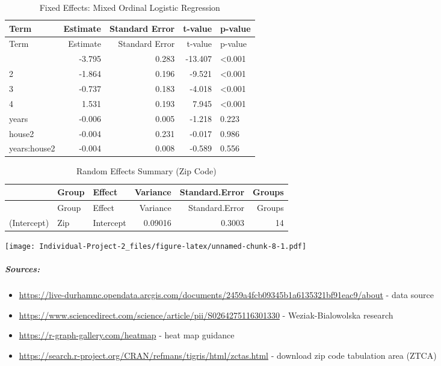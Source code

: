 \documentclass[
  4pt,
]{article}
\providecommand{\tightlist}{%
  \setlength{\itemsep}{0pt}\setlength{\parskip}{0pt}}
\begin{document}
\begin{longtable}[]{@{}lrrrl@{}}
\caption{Fixed Effects: Mixed Ordinal Logistic
Regression}\tabularnewline
\toprule\noalign{}
Term & Estimate & Standard Error & t-value & p-value \\
\midrule\noalign{}
\endfirsthead
\toprule\noalign{}
Term & Estimate & Standard Error & t-value & p-value \\
\midrule\noalign{}
\endhead
\bottomrule\noalign{}
\endlastfoot
1\textbar2 & -3.795 & 0.283 & -13.407 & \textless0.001 \\
2\textbar3 & -1.864 & 0.196 & -9.521 & \textless0.001 \\
3\textbar4 & -0.737 & 0.183 & -4.018 & \textless0.001 \\
4\textbar5 & 1.531 & 0.193 & 7.945 & \textless0.001 \\
years & -0.006 & 0.005 & -1.218 & 0.223 \\
house2 & -0.004 & 0.231 & -0.017 & 0.986 \\
years:house2 & -0.004 & 0.008 & -0.589 & 0.556 \\
\end{longtable}

\begin{longtable}[]{@{}lllrrr@{}}
\caption{Random Effects Summary (Zip Code)}\tabularnewline
\toprule\noalign{}
& Group & Effect & Variance & Standard.Error & Groups \\
\midrule\noalign{}
\endfirsthead
\toprule\noalign{}
& Group & Effect & Variance & Standard.Error & Groups \\
\midrule\noalign{}
\endhead
\bottomrule\noalign{}
\endlastfoot
(Intercept) & Zip & Intercept & 0.09016 & 0.3003 & 14 \\
\end{longtable}

\texttt{[image: Individual-Project-2\_files/figure-latex/unnamed-chunk-8-1.pdf]}

\subparagraph{Sources:}\label{sources}

\begin{itemize}
\tightlist
\item
  \url{https://live-durhamnc.opendata.arcgis.com/documents/2459a4fcb09345b1a6135321bf91eac9/about}
  - data source
\item
  \url{https://www.sciencedirect.com/science/article/pii/S0264275116301330}
  - Weziak-Bialowolska research
\item
  \url{https://r-graph-gallery.com/heatmap} - heat map guidance
\item
  \url{https://search.r-project.org/CRAN/refmans/tigris/html/zctas.html}
  - download zip code tabulation area (ZTCA)
\end{itemize}
\end{document}
